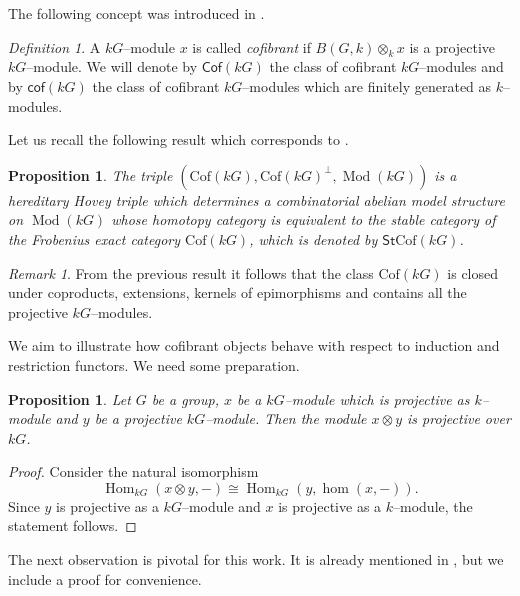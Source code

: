 \documentclass{amsart}
\newcommand{\Hom}{\operatorname{Hom}\nolimits}
\DeclareMathOperator{\Mod}{Mod}
\numberwithin{equation}{section}%
\newtheorem{proposition}[equation]{Proposition}
\theoremstyle{remark}
\newtheorem{definition}[equation]{Definition}
\newtheorem{remark}[equation]{Remark}
\begin{document}
\medskip
The following concept was introduced in \cite[Definition~4.1]{benson97}.

\begin{definition}
\label{def:cofibrants}
A $kG$--module $x$ is called \textit{cofibrant} if $B(G,k)\otimes_kx$ is a projective $kG$--module. We will denote by $\mathsf{Cof}(kG)$ the class of cofibrant $kG$--modules and by $\mathsf{cof}(kG)$ the class of cofibrant $kG$--modules which are finitely generated as $k$--modules.
\end{definition}

Let us recall the following result which corresponds to \cite[Proposition 4.12]{ET_cof}. 


\begin{proposition}\label{prop-model-struc}
The triple  $(\mathrm{Cof}(kG),\mathrm{Cof}(kG)^\perp,\Mod(kG))$ {is a hereditary Hovey triple} which determines a combinatorial abelian model structure on $\Mod(kG)$ whose homotopy category is {equivalent to} the stable category of the Frobenius exact category $\mathrm{Cof}(kG)$, which is denoted by $\mathsf{St}\mathrm{Cof}(kG)$.  
\end{proposition}

\begin{remark}
\label{rem:properties of cofs}
    From the previous result it follows that the class $\mathrm{Cof}(kG)$ is closed under coproducts, extensions, kernels of epimorphisms and contains all the projective $kG$--modules.   
\end{remark}

We aim to illustrate how cofibrant objects behave with respect to induction and restriction functors. We need some preparation. 

\begin{proposition}\label{prop-tensor-proje-latti}
    Let $G$ be a group, $x$ be a $kG$--module which is projective as $k$--module and $y$ be a projective $kG$--module. Then the module $x\otimes y$ is projective over $kG$.  
\end{proposition}

\begin{proof}
    Consider the natural isomorphism 
\[
\Hom_{kG}(x\otimes y,-) \cong \Hom_{kG}(y,\hom(x,-)).
\]
Since $y$ is projective as a $kG$--module and $x$ is projective as a $k$--module, the statement follows.
\end{proof}

The next observation is pivotal for this work. It is already mentioned in \cite{BG}, but we include a proof for convenience. 
\end{document}
